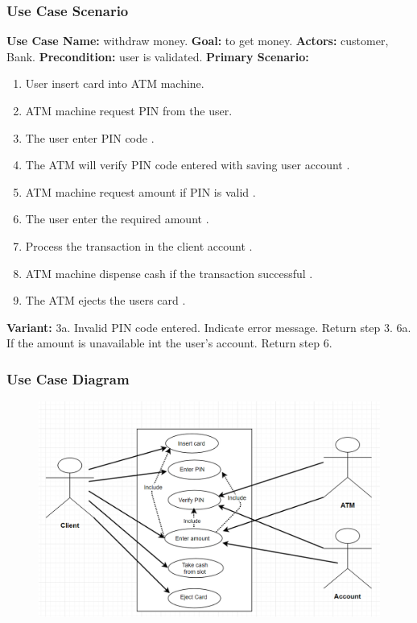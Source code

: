 \documentclass{article}
\begin{document}
	\subsubsection{Use Case Scenario}
		\textbf{Use Case Name:} withdraw money.
		\newline\textbf{Goal:} to get money.
		\newline\textbf{Actors:} customer, Bank. 	
		\newline\textbf{Precondition:} user is validated. 	
		\newline\textbf{Primary Scenario:}	
			\begin{enumerate}[label*=\arabic*.]
				\item User insert  card  into ATM machine.
				\item ATM machine request PIN from the user.
				\item The user enter PIN code .
				\item The ATM will verify PIN code entered with saving user account .
				\item ATM machine request amount if PIN is valid .
				\item The user enter the required amount .
				\item Process the transaction in the client account .
				\item ATM machine dispense cash if  the transaction successful .
				\item The ATM ejects  the users card .
			\end{enumerate}
		\textbf{Variant:}\newline	
			\hspace*{5mm}3a. Invalid PIN code entered. Indicate error message. Return step 3.\newline
			\hspace*{5mm}6a. If the amount is unavailable int the user's account. Return step 6.

		\newpage\subsubsection{Use Case Diagram}
			\begin{figure}[h!]
			  \includegraphics[width=\linewidth]{img/withdraw_usecase.png}
			\end{figure}
\end{document}
